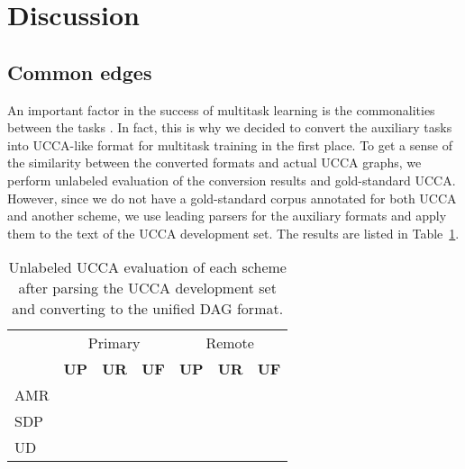 \documentclass[11pt,a4paper]{article}
\begin{document}
\section{Discussion}\label{sec:discussion}

\subsection{Common edges}\label{sec:common}

An important factor in the success of multitask learning is the commonalities between the tasks
\cite{E17-2026,E17-1005}.
In fact, this is why we decided to convert the auxiliary tasks into UCCA-like format for
multitask training in the first place.
To get a sense of the similarity between the converted formats and actual UCCA graphs,
we perform unlabeled evaluation of the conversion results and gold-standard UCCA.
However, since we do not have a gold-standard corpus annotated for both UCCA and another scheme,
we use leading parsers for the auxiliary formats and apply them to the text of the
UCCA development set. The results are listed in Table~\ref{tab:common}.

\begin{table}
\begin{tabular}{lccc|ccc}
& \multicolumn{3}{c|}{Primary} & \multicolumn{3}{c}{Remote} \\
& \textbf{UP} & \textbf{UR} & \textbf{UF} & \textbf{UP} & \textbf{UR} & \textbf{UF} \\
AMR \\
SDP \\
UD \\
\end{tabular}
\caption{Unlabeled UCCA evaluation of each scheme after parsing the UCCA development
set and converting to the unified DAG format.\label{tab:common}}
\end{table}




\end{document}
